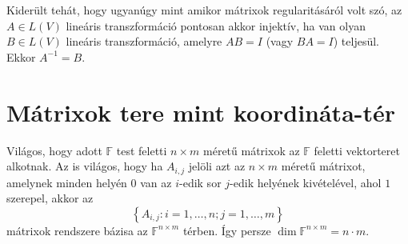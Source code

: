 \documentclass[9pt, showtrims]{memoir}
\theoremstyle{plain}
\theoremstyle{remark}
\theoremstyle{definition}
\renewcommand{\mathbf}{\mathbb}
\begin{document}
Kiderült tehát, hogy ugyanúgy mint amikor mátrixok regularitásáról volt szó, 
az $A\in L\left( V \right)$ lineáris transzformáció pontosan akkor injektív, 
ha van olyan $B\in L\left( V \right)$ lineáris transzformáció, 
amelyre $AB=I$ (vagy $BA=I$) teljesül.
Ekkor $A^{-1}=B$.

\section{Mátrixok tere mint koordináta-tér}
Világos, hogy adott $\mathbf{F}$ test feletti $n\times m$ méretű mátrixok az $\mathbf{F}$ feletti
vektorteret alkotnak.
Az is világos, hogy ha $A_{i,j}$ jelöli azt az $n\times m$ méretű mátrixot,
amelynek minden helyén $0$ van az $i$-edik sor $j$-edik helyének kivételével, ahol $1$ szerepel,
akkor az 
\[
    \left\{ A_{i,j}:i=1,\dots,n;j=1,\dots,m\right\}
\]
mátrixok rendszere bázisa az $\mathbf{F}^{n\times m}$ térben.
Így persze $\dim \mathbf{F}^{n\times m} = n\cdot m$.
\end{document}
